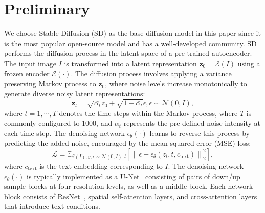 \section{Preliminary}
We choose Stable Diffusion (SD) as the base diffusion model in this paper since it is the most popular open-source model and has a well-developed community. SD performs the diffusion process in the latent space of a pre-trained autoencoder.
The input image $I$ is transformed into a latent representation $\boldsymbol{z}_{{0}} = \mathcal{E}(I)$ using a frozen encoder $\mathcal{E}(\cdot)$.
The diffusion process involves applying a variance preserving Markov process to $\boldsymbol{z}_{{0}}$, where noise levels increase monotonically to generate diverse noisy latent representations:
\begin{equation}
    \boldsymbol{z}_{{t}}=\sqrt{\bar{\alpha_{t}}} z_{0}+\sqrt{1-\bar{\alpha_{t}}} \epsilon, \epsilon \sim \mathcal{N}(0, I),
\end{equation}
where $t\!=\!1,\cdots, T$ denotes the time steps within the Markov process, where $T$ is commonly configured to 1000, and $\bar{\alpha_{t}}$ represents the pre-defined noise intensity at each time step. 
The denoising network $\epsilon_{\theta}(\cdot)$ learns to reverse this process by predicting the added noise, encouraged by the mean squared error (MSE) loss:
\begin{equation}
    \mathcal{L}=\mathbb{E}_{\mathcal{E}\left(I\right), y, \epsilon \sim \mathcal{N}(0, I), t}\left[\left\|\epsilon-\epsilon_{\theta}\left(z_{t}, t, c_{\mathrm{text}}\right)\right\|_{2}^{2}\right],
\end{equation}
where $c_{\mathrm{text}}$ is the text embedding corresponding to $I$. The denoising network $\epsilon_{\theta}(\cdot)$ is typically implemented as a U-Net~\citep{ronneberger2015unet} consisting of pairs of down/up sample blocks at four resolution levels, as well as a middle block. Each network block consists of ResNet~\citep{he2016deep}, spatial self-attention layers, and cross-attention layers that introduce text conditions.